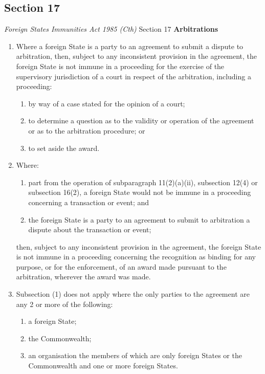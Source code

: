 \subsection{Section 17}
\begin{statutedetails}{\textit{Foreign States Immunities Act 1985 (Cth)} Section 17}
    \flushleft
    \textbf{Arbitrations}
    \begin{enumerate}
        \item Where a foreign State is a party to an agreement to submit a dispute to arbitration, then, subject to any inconsistent provision in the agreement, the foreign State is not immune in a proceeding for the exercise of the supervisory jurisdiction of a court in respect of the arbitration, including a proceeding:
        \begin{enumerate}
            \item by way of a case stated for the opinion of a court;
            \item to determine a question as to the validity or operation of the agreement or as to the arbitration procedure; or
            \item to set aside the award.
        \end{enumerate}
        \item Where:
        \begin{enumerate}[label=(\alph*)]
            \item part from the operation of subparagraph 11(2)(a)(ii), subsection 12(4) or subsection 16(2), a foreign State would not be immune in a proceeding concerning a transaction or event; and
            \item the foreign State is a party to an agreement to submit to arbitration a dispute about the transaction or event;
        \end{enumerate}
        then, subject to any inconsistent provision in the agreement, the foreign State is not immune in a proceeding concerning the recognition as binding for any purpose, or for the enforcement, of an award made pursuant to the arbitration, wherever the award was made.
        \item Subsection (1) does not apply where the only parties to the agreement are any 2 or more of the following:
        \begin{enumerate}[label=(\alph*)]
            \item a foreign State;
            \item the Commonwealth;
            \item an organisation the members of which are only foreign States or the Commonwealth and one or more foreign States.
        \end{enumerate}
    \end{enumerate}
\end{statutedetails}


